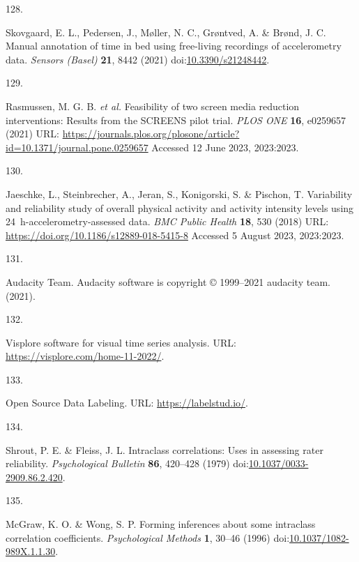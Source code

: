\documentclass[
  10pt,
]{scrbook}
\newlength{\cslhangindent}
\newlength{\csllabelwidth}
\newlength{\cslentryspacingunit} %
\newenvironment{CSLReferences}[2] %
 {%
  \setlength{\parindent}{0pt}
  \ifodd #1
  \let\oldpar\par
  \def\par{\hangindent=\cslhangindent\oldpar}
  \fi
  \setlength{\parskip}{#2\cslentryspacingunit}
 }%
 {}
\newcommand{\CSLLeftMargin}[1]{\parbox[t]{\csllabelwidth}{#1}}
\newcommand{\CSLRightInline}[1]{\parbox[t]{\linewidth - \csllabelwidth}{#1}\break}
\let\originaltextbf\textbf
\renewcommand{\textbf}[1]{\textcolor{color1}{\textsf{\originaltextbf{#1}}}}
\begin{document}
\begin{CSLReferences}{0}{0}
\leavevmode{}%
\CSLLeftMargin{128. }%
\CSLRightInline{Skovgaard, E. L., Pedersen, J., Møller, N. C., Grøntved,
A. \& Brønd, J. C. Manual annotation of time in bed using free-living
recordings of accelerometry data. \emph{Sensors (Basel)} \textbf{21},
8442 (2021)
doi:\href{https://doi.org/10.3390/s21248442}{10.3390/s21248442}.}

\leavevmode{}%
\CSLLeftMargin{129. }%
\CSLRightInline{Rasmussen, M. G. B. \emph{et al.} Feasibility of two
screen media reduction interventions: Results from the {SCREENS} pilot
trial. \emph{{PLOS} {ONE}} \textbf{16}, e0259657 (2021) URL:
\url{https://journals.plos.org/plosone/article?id=10.1371/journal.pone.0259657}
Accessed 12 June 2023, 2023:2023.}

\leavevmode{}%
\CSLLeftMargin{130. }%
\CSLRightInline{Jaeschke, L., Steinbrecher, A., Jeran, S., Konigorski,
S. \& Pischon, T. Variability and reliability study of overall physical
activity and activity intensity levels using 24~h-accelerometry-assessed
data. \emph{{BMC} Public Health} \textbf{18}, 530 (2018) URL:
\url{https://doi.org/10.1186/s12889-018-5415-8} Accessed 5 August 2023,
2023:2023.}

\leavevmode{}%
\CSLLeftMargin{131. }%
\CSLRightInline{Audacity Team. Audacity\textregistered{} software is
copyright © 1999--2021 audacity team. (2021).}

\leavevmode{}%
\CSLLeftMargin{132. }%
\CSLRightInline{Visplore {\textendash} software for visual time series
analysis. URL: \url{https://visplore.com/home-11-2022/}.}

\leavevmode{}%
\CSLLeftMargin{133. }%
\CSLRightInline{Open Source Data Labeling. URL:
\url{https://labelstud.io/}.}

\leavevmode{}%
\CSLLeftMargin{134. }%
\CSLRightInline{Shrout, P. E. \& Fleiss, J. L. Intraclass correlations:
Uses in assessing rater reliability. \emph{Psychological Bulletin}
\textbf{86}, 420--428 (1979)
doi:\href{https://doi.org/10.1037/0033-2909.86.2.420}{10.1037/0033-2909.86.2.420}.}

\leavevmode{}%
\CSLLeftMargin{135. }%
\CSLRightInline{McGraw, K. O. \& Wong, S. P. Forming inferences about
some intraclass correlation coefficients. \emph{Psychological Methods}
\textbf{1}, 30--46 (1996)
doi:\href{https://doi.org/10.1037/1082-989X.1.1.30}{10.1037/1082-989X.1.1.30}.}


\end{CSLReferences}
\end{document}
